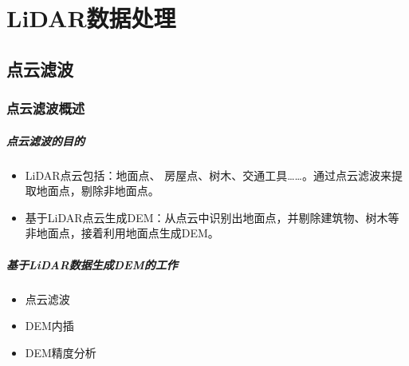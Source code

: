 
\chapter{LiDAR数据处理} %

\section{点云滤波} 
\subsection{点云滤波概述}

\paragraph{点云滤波的目的}
\begin{itemize}
	\item LiDAR点云包括：地面点、 房屋点、树木、交通工具……。通过点云滤波来提取地面点，剔除非地面点。
	\item 基于LiDAR点云生成DEM：从点云中识别出地面点，并剔除建筑物、树木等非地面点，接着利用地面点生成DEM。
\end{itemize}

\paragraph{基于LiDAR数据生成DEM的工作}
\begin{itemize}
	\item 点云滤波
	\item DEM内插
	\item DEM精度分析
\end{itemize}

